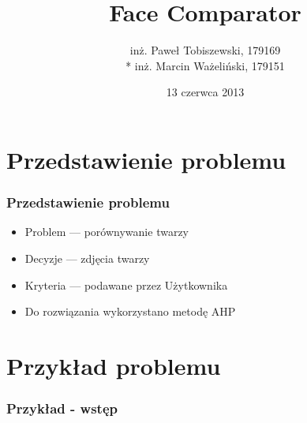 \documentclass{beamer}
\title{Face Comparator}
\author[PT MW]{
	inż. Paweł Tobiszewski, 179169\\*
	inż. Marcin Ważeliński, 179151
}
\institute[PWr]{Wydział Informatyki i Zarządzania, Politechnika Wrocławska}
\date{13 czerwca 2013}
\begin{document}
\begin{frame}
	\titlepage
\end{frame}

\section{Przedstawienie problemu}
\begin{frame}
\frametitle{Przedstawienie problemu}
	\begin{itemize}
	\item Problem --- porównywanie twarzy
	\item Decyzje --- zdjęcia twarzy
	\item Kryteria --- podawane przez Użytkownika
	\item Do rozwiązania wykorzystano metodę AHP
	\end{itemize}
\end{frame}

\section{Przykład problemu}
\begin{frame}
\frametitle{Przykład - wstęp}
\end{frame}
\end{document}
